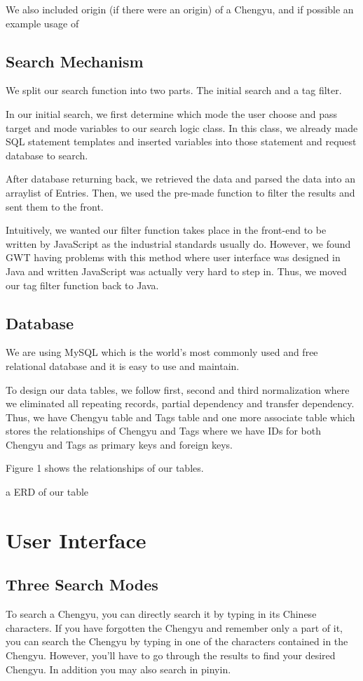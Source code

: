\documentclass[11pt]{article} %
\begin{document}
We also included origin (if there were an origin) of a Chengyu, and if possible an example usage of 

\subsection{Search Mechanism}

\indent We split our search function into two parts. The initial search and a tag filter.

In our initial search, we first determine which mode the user choose and pass target and mode variables to our search logic class. In this class, we already made SQL statement templates and inserted variables into those statement and request database to search.

After database returning back, we retrieved the data and parsed the data into an arraylist of Entries. Then, we used the pre-made function to filter the results and sent them to the front.

Intuitively, we wanted our filter function takes place in the front-end to be written by JavaScript as the industrial standards usually do. However, we found GWT having problems with this method where user interface was designed in Java and written JavaScript was actually very hard to step in. Thus, we moved our tag filter function back to Java. 

\subsection{Database}
\indent We are using MySQL which is the world's most commonly used and free relational database and it is easy to use and maintain.

To design our data tables, we follow first, second and third normalization where we eliminated all repeating records, partial dependency and transfer dependency. Thus, we have Chengyu table and Tags table and one more associate table which stores the relationships of Chengyu and Tags where we have IDs for both Chengyu and Tags as primary keys and foreign keys.

Figure 1 shows the relationships of our tables.

\indent a ERD of our table

\section{User Interface}

\subsection{Three Search Modes}
\indent To search a Chengyu, you can directly search it by typing in its Chinese characters. If you have forgotten the Chengyu and remember only a part of it, you can search the Chengyu by typing in one of the characters contained in the Chengyu. However, you'll have to go through the results to find your desired Chengyu. In addition you may also search in pinyin.
\end{document}

